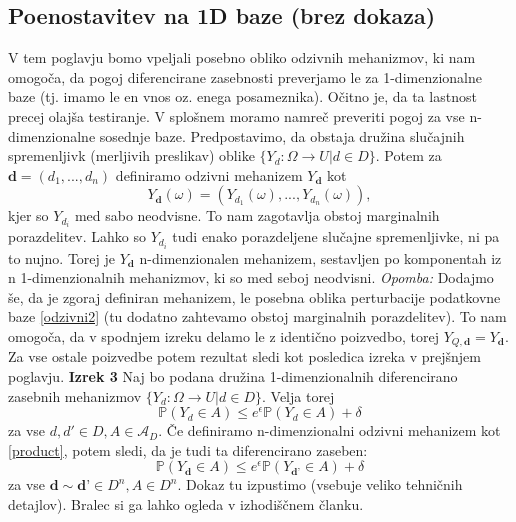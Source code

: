 \documentclass[mat1]{article}
\theoremstyle{definition}
\begin{document}
\subsection{Poenostavitev na 1D baze (brez dokaza)}
V tem poglavju bomo vpeljali posebno obliko odzivnih mehanizmov, ki nam omogoča, da pogoj diferencirane zasebnosti preverjamo le za 1-dimenzionalne baze (tj. imamo le en vnos oz. enega posameznika). Očitno je, da ta lastnost precej olajša testiranje. V splošnem moramo namreč preveriti pogoj za vse n-dimenzionalne sosednje baze.
\newline
\newline
Predpostavimo, da obstaja družina slučajnih spremenljivk (merljivih preslikav) oblike $\{ Y_d: \Omega \rightarrow U | d \in D\}$.  Potem za $\textbf{d} = (d_1,...,d_n)$ definiramo odzivni mehanizem $Y_{\textbf{d}}$ kot  
\begin{equation}\label{product}
Y_{\textbf{d}} (\omega) = (Y_{d_1} (\omega) , ... , Y_{d_n} (\omega)), \tag{5}
\end{equation}
kjer so $Y_{d_i}$ med sabo neodvisne. To nam zagotavlja obstoj marginalnih porazdelitev.  Lahko so $Y_{d_i}$ tudi enako porazdeljene slučajne spremenljivke, ni pa to nujno. Torej je $Y_{\textbf{d}}$ n-dimenzionalen mehanizem, sestavljen po komponentah iz n 1-dimenzionalnih mehanizmov, ki so med seboj neodvisni. 
\newline
\newline
\textit{Opomba:} Dodajmo še, da je zgoraj definiran mehanizem, le posebna oblika perturbacije podatkovne baze \eqref{odzivni2} (tu dodatno zahtevamo obstoj marginalnih porazdelitev). To nam omogoča, da v spodnjem izreku delamo le z identično poizvedbo, torej $Y_{Q, \textbf{d}}=Y_{\textbf{d}}$. Za vse ostale poizvedbe potem rezultat sledi kot posledica izreka v prejšnjem poglavju. 
\newline
\newline
\textbf{Izrek 3} Naj bo podana družina 1-dimenzionalnih diferencirano zasebnih mehanizmov $\{ Y_d: \Omega \rightarrow U | d \in D\}$. Velja torej
$$\mathbb{P}(Y_d \in A) \leq e^\epsilon \mathbb{P}(Y_d \in A) + \delta$$ 
za vse $d,d' \in D, A \in \mathcal{A}_D$. Če definiramo n-dimenzionalni odzivni mehanizem kot \eqref{product}, potem sledi, da je tudi ta diferencirano zaseben:
$$\mathbb{P}(Y_{\textbf{d}} \in A) \leq e^\epsilon \mathbb{P}(Y_{\textbf{d'}} \in A) + \delta$$
za vse $\textbf{d} \sim \textbf{d'} \in D^n, A \in D^n$.
\newline
\newline
Dokaz tu izpustimo (vsebuje veliko tehničnih detajlov). Bralec si ga lahko ogleda v izhodiščnem članku.
\end{document}
